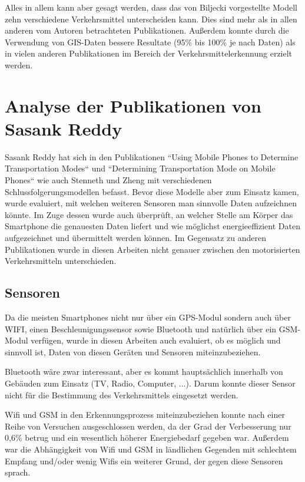 Alles in allem kann aber gesagt werden, dass das von Biljecki vorgestellte Modell zehn verschiedene Verkehrsmittel unterscheiden kann. Dies sind mehr als in allen anderen vom Autoren betrachteten Publikationen. Außerdem konnte durch die Verwendung von GIS-Daten bessere Resultate (95\% bis 100\% je nach Daten) als in vielen anderen Publikationen im Bereich der Verkehrsmittelerkennung erzielt werden. 

\section{Analyse der Publikationen von Sasank Reddy}
Sasank Reddy hat sich in den Publikationen ``Using Mobile Phones to Determine Transportation Modes`` \cite{reddy_using_2010} und ``Determining Transportation Mode on Mobile Phones`` \cite{reddy_determining_2008} wie auch Stenneth und Zheng mit verschiedenen Schlussfolgerungsmodellen befasst. Bevor diese Modelle aber zum Einsatz kamen, wurde evaluiert, mit welchen weiteren Sensoren man sinnvolle Daten aufzeichnen könnte. Im Zuge dessen wurde auch überprüft, an welcher Stelle am Körper das Smartphone die genauesten Daten liefert und wie möglichst energieeffizient Daten aufgezeichnet und übermittelt werden können. Im Gegensatz zu anderen Publikationen wurde in diesen Arbeiten nicht genauer zwischen den motorisierten Verkehrsmitteln unterschieden.

\subsection{Sensoren}
Da die meisten Smartphones nicht nur über ein GPS-Modul sondern auch über WIFI, einen Beschleunigungssensor sowie Bluetooth und natürlich über ein GSM-Modul verfügen, wurde in diesen Arbeiten auch evaluiert, ob es möglich und sinnvoll ist, Daten von diesen Geräten und Sensoren miteinzubeziehen. 

Bluetooth  wäre zwar interessant, aber es kommt hauptsächlich innerhalb von Gebäuden zum Einsatz (TV, Radio, Computer, ...). Darum konnte dieser Sensor nicht für die Bestimmung des Verkehrsmittels eingesetzt werden. 

Wifi und GSM in den Erkennungsprozess miteinzubeziehen konnte nach einer Reihe von Versuchen ausgeschlossen werden, da der Grad der Verbesserung nur 0,6\% betrug und ein wesentlich höherer Energiebedarf gegeben war. Außerdem war die Abhängigkeit von Wifi und GSM in ländlichen Gegenden mit schlechtem Empfang und/oder wenig Wifis ein weiterer Grund, der gegen diese Sensoren sprach.

